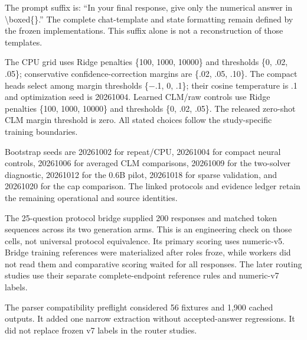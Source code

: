 \documentclass[11pt,a4paper]{article}
\begin{document}
\endgroup\linenumbers
The prompt suffix is: ``In your final response, give only the numerical answer in \textbackslash{}boxed\{\}.'' The complete chat-template and state formatting remain defined by the frozen implementations. This suffix alone is not a reconstruction of those templates.

The CPU grid uses Ridge penalties \{100, 1000, 10000\} and thresholds \{0, .02, .05\}; conservative confidence-correction margins are \{.02, .05, .10\}. The compact heads select among margin thresholds \{\ensuremath{-}.1, 0, .1\}; their cosine temperature is .1 and optimization seed is 20261004. Learned CLM/raw controls use Ridge penalties \{100, 1000, 10000\} and thresholds \{0, .02, .05\}. The released zero-shot CLM margin threshold is zero. All stated choices follow the study-specific training boundaries.

Bootstrap seeds are 20261002 for repeat/CPU, 20261004 for compact neural controls, 20261006 for averaged CLM comparisons, 20261009 for the two-solver diagnostic, 20261012 for the 0.6B pilot, 20261018 for sparse validation, and 20261020 for the cap comparison. The linked protocols and evidence ledger retain the remaining operational and source identities.

The 25-question protocol bridge supplied 200 responses and matched token sequences across its two generation arms. This is an engineering check on those cells, not universal protocol equivalence. Its primary scoring uses numeric-v5. Bridge training references were materialized after roles froze, while workers did not read them and comparative scoring waited for all responses. The later routing studies use their separate complete-endpoint reference rules and numeric-v7 labels.

The parser compatibility preflight considered 56 fixtures and 1,900 cached outputs. It added one narrow extraction without accepted-answer regressions. It did not replace frozen v7 labels in the router studies.
\end{document}
